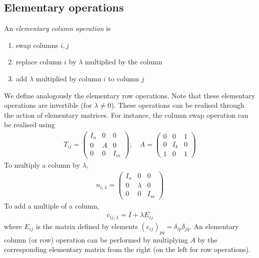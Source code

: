     \subsection{Elementary operations}
    \begin{definition}
        An \textit{elementary column operation} is
        \begin{enumerate}
            \item swap columns $i, j$
            \item replace column $i$ by $\lambda$ multiplied by the column
            \item add $\lambda$ multiplied by column $i$ to column $j$
        \end{enumerate}
    \end{definition}
    We define analogously the elementary row operations.
    Note that these elementary operations are invertible (for $\lambda \neq 0$).
    These operations can be realised through the action of elementary matrices.
    For instance, the column swap operation can be realised using
    \begin{align*}
        T_{ij} = \begin{pmatrix}
            I_n & 0 & 0   \\
            0   & A & 0   \\
            0   & 0 & I_m
        \end{pmatrix};\quad A = \begin{pmatrix}
            0 & 0   & 1 \\
            0 & I_k & 0 \\
            1 & 0   & 1
        \end{pmatrix}
    \end{align*}
    To multiply a column by $\lambda$,
    \begin{align*}
        n_{i,\lambda} = \begin{pmatrix}
            I_n & 0       & 0   \\
            0   & \lambda & 0   \\
            0   & 0       & I_m
        \end{pmatrix}
    \end{align*}
    To add a multiple of a column,
    \begin{align*}
        c_{ij,\lambda} = I + \lambda E_{ij}
    \end{align*}
    where $E_{ij}$ is the matrix defined by elements $(e_{ij})_{pq} = \delta_{ip} \delta_{jq}$.
    An elementary column (or row) operation can be performed by multiplying $A$ by the corresponding elementary matrix from the right (on the left for row operations).
